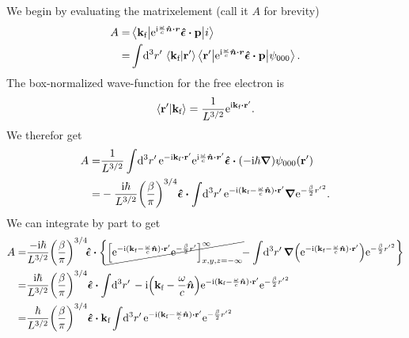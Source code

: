 \documentclass[11pt,letter, swedish, english
]{article}
\begin{document}
We begin by evaluating the matrixelement (call it $A$ for brevity)
\begin{equation}
\begin{aligned}
A=&\mel**{\vkf}{\ee^{\ii\frac{\omega}{c}\vu*{n}\vdot\vb*{r}}
\vu*{\epsilon}\vdot\vb{p}}{i}\\
=&\int\!\rd^3r'\,
\ip{\vkf}{\vb{r}'}
\mel**{\vb{r}'}{\ee^{\ii\frac{\omega}{c}\vu*{n}\vdot\vb*{r}}
\vu*{\epsilon}\vdot\vb{p}}{\psi_{000}}.
\end{aligned}
\end{equation}
The box-normalized wave-function for the free electron is
\begin{equation}
\ip{\vb{r}'}{\vkf}=\frac{1}{L^{3/2}}\ee^{\ii\vkf\vdot\vb{r}'}.
\end{equation}
We therefor get
\begin{equation}
\begin{aligned}
A=&\frac{1}{L^{3/2}}\int\!\rd^3r'\,
\ee^{-\ii\vkf\vdot\vb{r}'}
\ee^{\ii\frac{\omega}{c}\vu*{n}\vdot\vb*{r}'}
\vu*{\epsilon}\vdot(-\ii\hbar\grad)\psi_{000}(\vb{r}')\\
=&-\frac{\ii\hbar}{L^{3/2}} \qty(\frac{\beta}{\pi})^{3/4}
\vu*{\epsilon}\vdot\int\!\rd^3r'\,
\ee^{-\ii(\vkf-\frac{\omega}{c}\vu*{n})\vdot\vb{r}'}
\grad\ee^{-\frac{\beta}{2}{r'}^2}.
\end{aligned}
\end{equation}
We can integrate by part to get
\begin{equation}
\begin{aligned}
A=&\frac{-\ii\hbar}{L^{3/2}} \qty(\frac{\beta}{\pi})^{3/4}
\!\vu*{\epsilon}\vdot\qty{
\cancel{\qty[\ee^{-\ii(\vkf-\frac{\omega}{c}\vu*{n})\vdot\vb{r}'}
\ee^{-\frac{\beta}{2}r'}]_{x,y,z=-\infty}^\infty}
\!\!-\int\!\rd^3r'\,
\grad\qty(\ee^{-\ii(\vkf-\frac{\omega}{c}\vu*{n})\vdot\vb{r}'})
\ee^{-\frac{\beta}{2}{r'}^2}}\\
=&\frac{\ii\hbar}{L^{3/2}} \qty(\frac{\beta}{\pi})^{3/4}
\vu*{\epsilon}\vdot\int\!\rd^3r'\,
-\ii\qty(\vkf-\frac{\omega}{c}\vu*{n})
\ee^{-\ii(\vkf-\frac{\omega}{c}\vu*{n})\vdot\vb{r}'}
\ee^{-\frac{\beta}{2}{r'}^2}\\
=&\frac{\hbar}{L^{3/2}} \qty(\frac{\beta}{\pi})^{3/4}
\vu*{\epsilon}\vdot\vkf\int\!\rd^3r'\,
\ee^{-\ii(\vkf-\frac{\omega}{c}\vu*{n})\vdot\vb{r}'}
\ee^{-\frac{\beta}{2}{r'}^2}\\
\end{aligned}
\end{equation}
\end{document}
